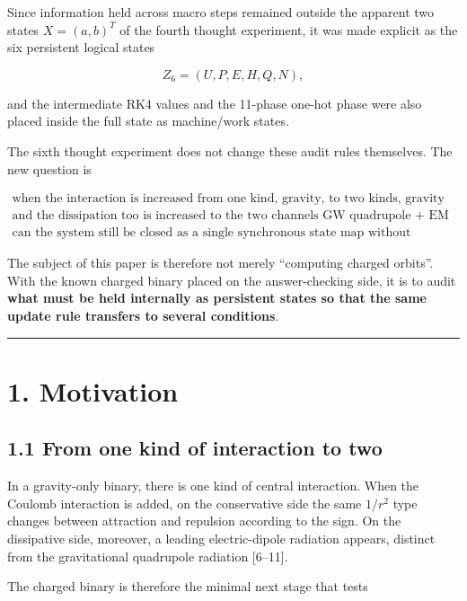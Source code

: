 \documentclass[
  a4paper,
]{article}
\begin{document}
Since information held across macro steps remained outside the apparent
two states \(X=(a,b)^T\) of the fourth thought experiment, it was made
explicit as the six persistent logical states

\[
Z_6=(U,P,E,H,Q,N),
\]

and the intermediate RK4 values and the 11-phase one-hot phase were also
placed inside the full state as machine/work states.

The sixth thought experiment does not change these audit rules
themselves. The new question is

\[
\boxed{
\begin{array}{c}
\text{when the interaction is increased from one kind, gravity, to two kinds, gravity + Coulomb,}\\
\text{and the dissipation too is increased to the two channels GW quadrupole + EM dipole,}\\
\text{can the system still be closed as a single synchronous state map without external physical information?}
\end{array}
}
\]

The subject of this paper is therefore not merely ``computing charged
orbits''. With the known charged binary placed on the answer-checking
side, it is to audit \textbf{what must be held internally as persistent
states so that the same update rule transfers to several conditions}.

\begin{center}\rule{0.5\linewidth}{0.5pt}\end{center}

\section{1. Motivation}\label{motivation}

\subsection{1.1 From one kind of interaction to
two}\label{from-one-kind-of-interaction-to-two}

In a gravity-only binary, there is one kind of central interaction. When
the Coulomb interaction is added, on the conservative side the same
\(1/r^2\) type changes between attraction and repulsion according to the
sign. On the dissipative side, moreover, a leading electric-dipole
radiation appears, distinct from the gravitational quadrupole radiation
{[}6--11{]}.

The charged binary is therefore the minimal next stage that tests
\end{document}
